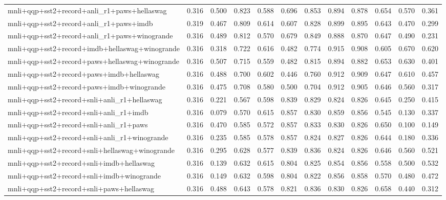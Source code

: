 \begin{table}[t]
\begin{tabular}{lrrrrrrrrrrr}
    mnli+qqp+sst2+record+anli\_r1+paws+hellaswag & 0.316 & 0.500 & 0.823 & 0.588 & 0.696 & 0.853 & 0.894 & 0.878 & 0.654 & 0.570 & 0.361 \\
    mnli+qqp+sst2+record+anli\_r1+paws+imdb & 0.319 & 0.467 & 0.809 & 0.614 & 0.607 & 0.828 & 0.899 & 0.895 & 0.643 & 0.470 & 0.299 \\
    mnli+qqp+sst2+record+anli\_r1+paws+winogrande & 0.316 & 0.489 & 0.812 & 0.570 & 0.679 & 0.849 & 0.888 & 0.870 & 0.647 & 0.490 & 0.231 \\
    mnli+qqp+sst2+record+imdb+hellaswag+winogrande & 0.316 & 0.318 & 0.722 & 0.616 & 0.482 & 0.774 & 0.915 & 0.908 & 0.605 & 0.670 & 0.620 \\
    mnli+qqp+sst2+record+paws+hellaswag+winogrande & 0.316 & 0.507 & 0.715 & 0.559 & 0.482 & 0.815 & 0.894 & 0.882 & 0.653 & 0.630 & 0.401 \\
    mnli+qqp+sst2+record+paws+imdb+hellaswag & 0.316 & 0.488 & 0.700 & 0.602 & 0.446 & 0.760 & 0.912 & 0.909 & 0.647 & 0.610 & 0.457 \\
    mnli+qqp+sst2+record+paws+imdb+winogrande & 0.316 & 0.475 & 0.708 & 0.580 & 0.500 & 0.704 & 0.912 & 0.905 & 0.646 & 0.560 & 0.317 \\
    mnli+qqp+sst2+record+snli+anli\_r1+hellaswag & 0.316 & 0.221 & 0.567 & 0.598 & 0.839 & 0.829 & 0.824 & 0.826 & 0.645 & 0.250 & 0.415 \\
    mnli+qqp+sst2+record+snli+anli\_r1+imdb & 0.316 & 0.079 & 0.570 & 0.615 & 0.857 & 0.830 & 0.859 & 0.856 & 0.545 & 0.130 & 0.337 \\
    mnli+qqp+sst2+record+snli+anli\_r1+paws & 0.316 & 0.470 & 0.585 & 0.572 & 0.857 & 0.833 & 0.830 & 0.826 & 0.650 & 0.100 & 0.149 \\
    mnli+qqp+sst2+record+snli+anli\_r1+winogrande & 0.316 & 0.235 & 0.585 & 0.578 & 0.857 & 0.824 & 0.827 & 0.826 & 0.644 & 0.180 & 0.336 \\
    mnli+qqp+sst2+record+snli+hellaswag+winogrande & 0.316 & 0.295 & 0.628 & 0.577 & 0.839 & 0.836 & 0.824 & 0.826 & 0.646 & 0.560 & 0.521 \\
    mnli+qqp+sst2+record+snli+imdb+hellaswag & 0.316 & 0.139 & 0.632 & 0.615 & 0.804 & 0.825 & 0.854 & 0.856 & 0.558 & 0.500 & 0.532 \\
    mnli+qqp+sst2+record+snli+imdb+winogrande & 0.316 & 0.149 & 0.632 & 0.598 & 0.804 & 0.822 & 0.856 & 0.858 & 0.570 & 0.480 & 0.472 \\
    mnli+qqp+sst2+record+snli+paws+hellaswag & 0.316 & 0.488 & 0.643 & 0.578 & 0.821 & 0.836 & 0.830 & 0.826 & 0.658 & 0.440 & 0.312 \\

\end{tabular}
\end{table}
